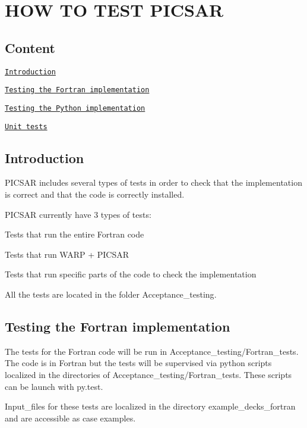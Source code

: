\section*{H\+OW TO T\+E\+ST P\+I\+C\+S\+AR }

\subsection*{Content }

\href{#intro}{\tt Introduction}

\href{#fortran}{\tt Testing the Fortran implementation}

\href{#python}{\tt Testing the Python implementation}

\href{#unit}{\tt Unit tests}

\subsection*{Introduction  }

P\+I\+C\+S\+AR includes several types of tests in order to check that the implementation is correct and that the code is correctly installed.

P\+I\+C\+S\+AR currently have 3 types of tests\+:


\begin{DoxyItemize}
\item Tests that run the entire Fortran code
\item Tests that run W\+A\+RP + P\+I\+C\+S\+AR
\item Tests that run specific parts of the code to check the implementation
\end{DoxyItemize}

All the tests are located in the folder {\ttfamily Acceptance\+\_\+testing}.

\subsection*{Testing the Fortran implementation  }

The tests for the Fortran code will be run in {\ttfamily Acceptance\+\_\+testing/\+Fortran\+\_\+tests}. The code is in Fortran but the tests will be supervised via python scripts localized in the directories of {\ttfamily Acceptance\+\_\+testing/\+Fortran\+\_\+tests}. These scripts can be launch with py.\+test.

Input\+\_\+files for these tests are localized in the directory {\ttfamily example\+\_\+decks\+\_\+fortran} and are accessible as case examples.

